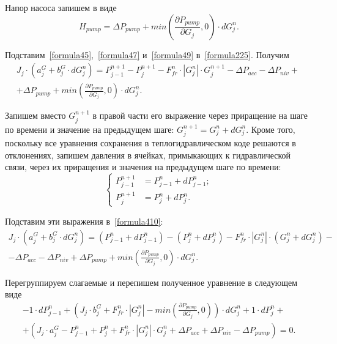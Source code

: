 Напор насоса запишем в виде
\begin{equation}
\label{formula49}
H_{pump}=\Delta P_{pump}+min\left(\frac{\partial P_{pump}}{\partial G_j},0\right)\cdot dG_j^n.
\end{equation}

Подставим~\eqref{formula45},~\eqref{formula47} и~\eqref{formula49} в~\eqref{formula225}. Получим
\begin{eqnarray}
\label{formula410}
J_j \cdot (a_j^G + b_j^G \cdot dG_j^n)  = 
P_{j-1}^{n+1} - P_j^{n+1} - F_{fr}^n\cdot | G_j^n | \cdot G_j^{n+1} - \Delta P_{acc} - \Delta P_{niv} + \nonumber ~\\
+ \Delta P_{pump}+min\left(\frac{\partial P_{pump}}{\partial G_j},0\right)\cdot dG_j^n. 	
\end{eqnarray}

Запишем вместо $G_j^{n+1}$ в правой части его выражение через приращение на шаге по времени и значение на предыдущем шаге: $G_j^{n+1}=G_j^n+dG_j^n$. Кроме того, поскольку все уравнения сохранения в теплогидравлическом коде решаются в отклонениях, запишем давления в ячейках, примыкающих к гидравлической связи, через их приращения и значения на предыдущем шаге по времени:
\begin{equation*}
\left\{
\begin{aligned}
	P_{j-1}^{n+1} & = P_{j-1}^n + dP_{j-1}^n; \\
	P_j^{n+1} & = P_j^n + dP_j^n.
\end{aligned}
\right.
\end{equation*}

Подставим эти выражения в~\eqref{formula410}:    
\begin{eqnarray}
\label{formula411}
J_j \cdot (a_j^G + b_j^G \cdot dG_j^n)  = 
(P_{j-1}^n + dP_{j-1}^n) - (P_j^n + dP_j^n) - F_{fr}^n\cdot | G_j^n | \cdot (G_j^n+dG_j^n) - \nonumber ~\\
- \Delta P_{acc} - \Delta P_{niv} + \Delta P_{pump}+min\left(\frac{\partial P_{pump}}{\partial G_j},0\right)\cdot dG_j^n. 	
\end{eqnarray}

Перегруппируем слагаемые и перепишем полученное уравнение в следующем \hphantom{aaa} виде
\begin{eqnarray}
\label{formula412}
-1\cdot dP_{j-1}^n+\left(J_j \cdot b_j^G + F_{fr}^n\cdot | G_j^n | - min\left(\frac{\partial P_{pump}}{\partial G_j},0\right)   \right)\cdot dG_j^n +1 \cdot dP_j^n + \nonumber ~\\
+ \left(J_j \cdot a_j^G - P_{j-1}^n + P_j^n + F_{fr}^n\cdot | G_j^n | \cdot G_j^n + \Delta P_{acc} + \Delta P_{niv} - \Delta P_{pump}  \right) = 0. 	
\end{eqnarray}

